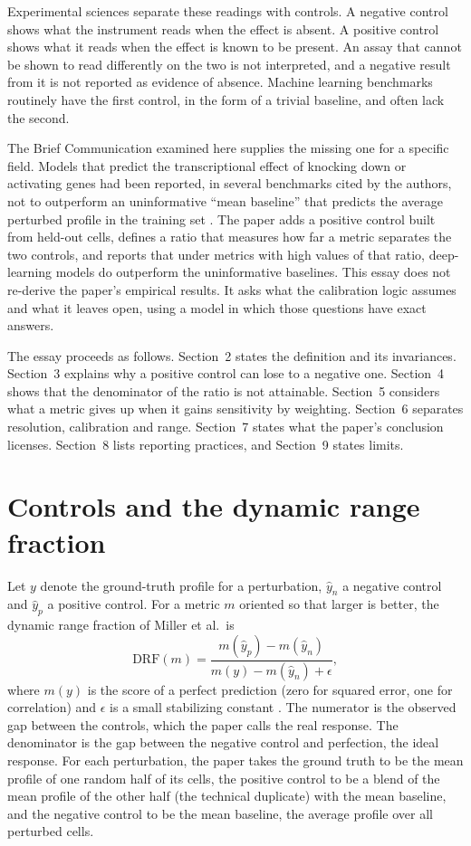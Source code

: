 \documentclass[11pt]{article}
\theoremstyle{definition}
\newcommand{\DRF}{\mathrm{DRF}}
\begin{document}
Experimental sciences separate these readings with controls. A negative control shows what the instrument reads when the effect is absent. A positive control shows what it reads when the effect is known to be present. An assay that cannot be shown to read differently on the two is not interpreted, and a negative result from it is not reported as evidence of absence. Machine learning benchmarks routinely have the first control, in the form of a trivial baseline, and often lack the second.

The Brief Communication examined here supplies the missing one for a specific field. Models that predict the transcriptional effect of knocking down or activating genes had been reported, in several benchmarks cited by the authors, not to outperform an uninformative ``mean baseline'' that predicts the average perturbed profile in the training set \citep{miller2026}. The paper adds a positive control built from held-out cells, defines a ratio that measures how far a metric separates the two controls, and reports that under metrics with high values of that ratio, deep-learning models do outperform the uninformative baselines. This essay does not re-derive the paper's empirical results. It asks what the calibration logic assumes and what it leaves open, using a model in which those questions have exact answers.

The essay proceeds as follows. Section~2 states the definition and its invariances. Section~3 explains why a positive control can lose to a negative one. Section~4 shows that the denominator of the ratio is not attainable. Section~5 considers what a metric gives up when it gains sensitivity by weighting. Section~6 separates resolution, calibration and range. Section~7 states what the paper's conclusion licenses. Section~8 lists reporting practices, and Section~9 states limits.

\section{Controls and the dynamic range fraction}

Let $y$ denote the ground-truth profile for a perturbation, $\hat y_n$ a negative control and $\hat y_p$ a positive control. For a metric $m$ oriented so that larger is better, the dynamic range fraction of Miller et al.\ is
\[
\DRF(m)=\frac{m(\hat y_p)-m(\hat y_n)}{m(y)-m(\hat y_n)+\epsilon},
\]
where $m(y)$ is the score of a perfect prediction (zero for squared error, one for correlation) and $\epsilon$ is a small stabilizing constant \citep{miller2026}. The numerator is the observed gap between the controls, which the paper calls the real response. The denominator is the gap between the negative control and perfection, the ideal response. For each perturbation, the paper takes the ground truth to be the mean profile of one random half of its cells, the positive control to be a blend of the mean profile of the other half (the technical duplicate) with the mean baseline, and the negative control to be the mean baseline, the average profile over all perturbed cells.
\end{document}
